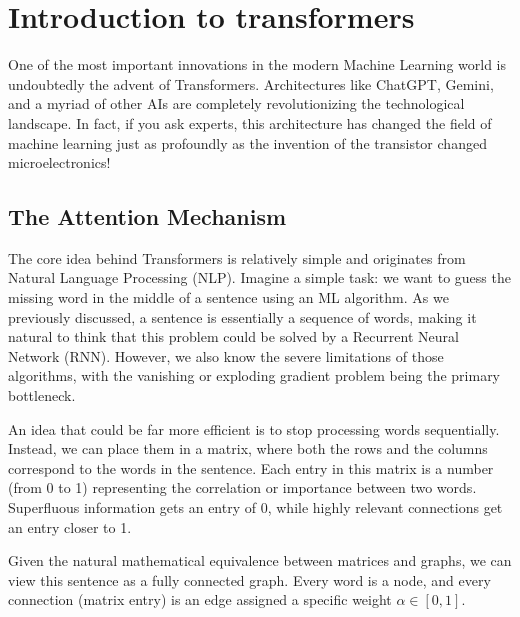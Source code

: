 \section{Introduction to transformers}\label{sec:transformers}

One of the most important innovations in the modern Machine Learning world is undoubtedly the advent of Transformers. Architectures like ChatGPT, Gemini, and a myriad of other AIs are completely revolutionizing the technological landscape. In fact, if you ask experts, this architecture has changed the field of machine learning just as profoundly as the invention of the transistor changed microelectronics! 

\subsection{The Attention Mechanism}

The core idea behind Transformers is relatively simple and originates from Natural Language Processing (NLP). Imagine a simple task: we want to guess the missing word in the middle of a sentence using an ML algorithm. As we previously discussed, a sentence is essentially a sequence of words, making it natural to think that this problem could be solved by a Recurrent Neural Network (RNN). However, we also know the severe limitations of those algorithms, with the vanishing or exploding gradient problem being the primary bottleneck.

An idea that could be far more efficient is to stop processing words sequentially. Instead, we can place them in a matrix, where both the rows and the columns correspond to the words in the sentence. Each entry in this matrix is a number (from 0 to 1) representing the correlation or importance between two words. Superfluous information gets an entry of 0, while highly relevant connections get an entry closer to 1. 

Given the natural mathematical equivalence between matrices and graphs, we can view this sentence as a fully connected graph. Every word is a node, and every connection (matrix entry) is an edge assigned a specific weight $\alpha \in [0,1]$. 


